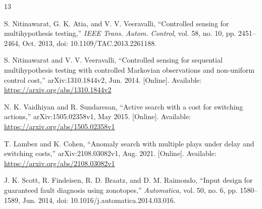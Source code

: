 \begin{thebibliography}{13}

S. Nitinawarat, G. K. Atia, and V. V. Veeravalli,
``Controlled sensing for multihypothesis testing,''
\emph{IEEE Trans. Autom. Control}, vol. 58, no. 10,
pp. 2451--2464, Oct. 2013, doi: 10.1109/TAC.2013.2261188.

S. Nitinawarat and V. V. Veeravalli,
``Controlled sensing for sequential multihypothesis testing with controlled
Markovian observations and non-uniform control cost,''
arXiv:1310.1844v2, Jun. 2014.
[Online]. Available: \url{https://arxiv.org/abs/1310.1844v2}

N. K. Vaidhiyan and R. Sundaresan,
``Active search with a cost for switching actions,''
arXiv:1505.02358v1, May 2015.
[Online]. Available: \url{https://arxiv.org/abs/1505.02358v1}

T. Lambez and K. Cohen,
``Anomaly search with multiple plays under delay and switching costs,''
arXiv:2108.03082v1, Aug. 2021.
[Online]. Available: \url{https://arxiv.org/abs/2108.03082v1}

J. K. Scott, R. Findeisen, R. D. Braatz, and D. M. Raimondo,
``Input design for guaranteed fault diagnosis using zonotopes,''
\emph{Automatica}, vol. 50, no. 6, pp. 1580--1589, Jun. 2014,
doi: 10.1016/j.automatica.2014.03.016.


\end{thebibliography}
